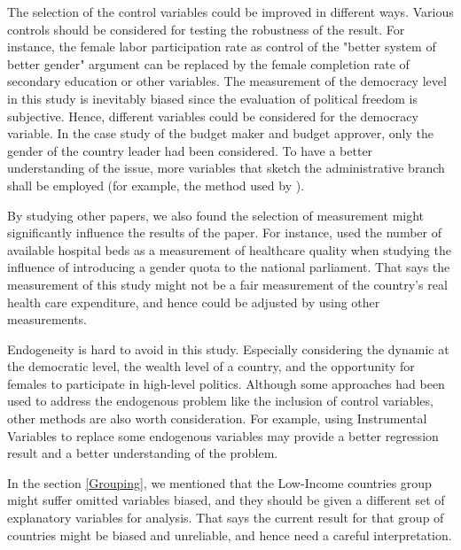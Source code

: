 The selection of the control variables could be improved in different ways.
Various controls should be considered for testing the robustness of the result.
For instance, the female labor participation rate as control of the "better system of better gender" argument can be replaced by the female completion rate of secondary education or other variables.
The measurement of the democracy level in this study is inevitably biased since the evaluation of political freedom is subjective.
Hence, different variables could be considered for the democracy variable.
In the case study of the budget maker and budget approver, only the gender of the country leader had been considered.
To have a better understanding of the issue, more variables that sketch the administrative branch shall be employed (for example, the method used by ).

By studying other papers, we also found the selection of measurement might significantly influence the results of the paper.
For instance,  used the number of available hospital beds as a measurement of healthcare quality when studying the influence of introducing a gender quota to the national parliament.
That says the measurement of this study might not be a fair measurement of the country's real health care expenditure, and hence could be adjusted by using other measurements. 


Endogeneity is hard to avoid in this study.
Especially considering the dynamic at the democratic level, the wealth level of a country, and the opportunity for females to participate in high-level politics.
Although some approaches had been used to address the endogenous problem like the inclusion of control variables, other methods are also worth consideration.
For example, using Instrumental Variables to replace some endogenous variables may provide a better regression result and a better understanding of the problem.

In the section \ref{Grouping}, we mentioned that the Low-Income countries group might suffer omitted variables biased, and they should be given a different set of explanatory variables for analysis.
That says the current result for that group of countries might be biased and unreliable, and hence need a careful interpretation.

